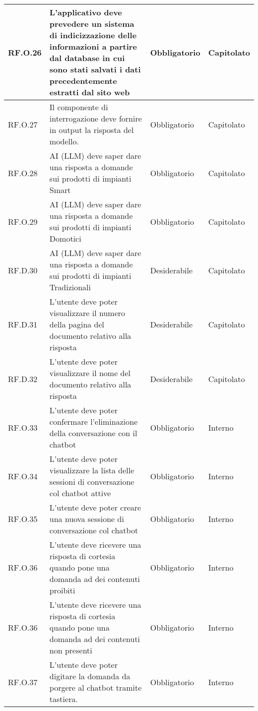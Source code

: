 \begin{longtable}{|C{2.7cm}|L{7.2cm}|C{2.7cm}|C{2cm}|}
         RF.O.26 & L’applicativo deve prevedere un sistema di indicizzazione delle informazioni a partire dal
        database in cui sono stati salvati i dati precedentemente estratti dal sito web
         & Obbligatorio & Capitolato \\
        \hline
        RF.O.27 & Il componente di interrogazione deve fornire in output la risposta del modello.
         & Obbligatorio & Capitolato \\
        \hline
        RF.O.28 & AI (LLM) deve saper dare una risposta a domande sui prodotti di impianti Smart
         & Obbligatorio & Capitolato \\
        \hline
        RF.O.29 & AI (LLM) deve saper dare una risposta a domande sui prodotti di impianti Domotici
         & Obbligatorio & Capitolato \\
        \hline
        RF.D.30 & AI (LLM) deve saper dare una risposta a domande sui prodotti di impianti Tradizionali
         & Desiderabile & Capitolato \\
        \hline
        RF.D.31 & L’utente deve poter visualizzare il numero della pagina del documento relativo alla risposta
         & Desiderabile & Capitolato \\
        \hline
        RF.D.32 & L’utente deve poter visualizzare il nome del documento relativo alla
        risposta
         & Desiderabile & Capitolato \\
        \hline
        RF.O.33 & L’utente deve poter confermare l'eliminazione della conversazione con il chatbot
         & Obbligatorio & Interno \\
        \hline
        RF.O.34 & L’utente deve poter visualizzare la lista delle
        sessioni di conversazione col chatbot attive
         & Obbligatorio & Interno \\
        \hline
        RF.O.35 & L’utente deve poter creare una nuova sessione di conversazione col chatbot
         & Obbligatorio & Interno \\
        \hline
        RF.O.36 & L’utente deve ricevere una risposta di cortesia quando pone una domanda ad dei contenuti proibiti
         & Obbligatorio & Interno \\
        \hline
        RF.O.36 & L’utente deve ricevere una risposta di cortesia quando pone una domanda ad dei contenuti non presenti
         & Obbligatorio & Interno \\
        \hline
        RF.O.37 & L’utente deve poter digitare la domanda da porgere al chatbot tramite tastiera.
         & Obbligatorio & Interno \\

\end{longtable}
